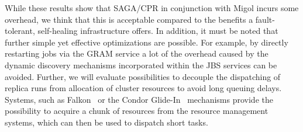 \documentclass[times, 10pt, twocolumn]{article}
\newcommand{\jhanote}[1]{ {\textcolor{red} { ***SJ: #1 }}}
\newcommand{\jhanote}[1]{}
\begin{document}

While these results show that SAGA/CPR in conjunction with Migol
incurs some overhead, we think that this is acceptable compared to the
benefits a fault-tolerant, self-healing infrastructure offers. In
addition, it must be noted that further simple yet effective
optimizations are possible. For example, by directly restarting jobs
via the GRAM service a lot of the overhead caused by the dynamic
discovery mechanisms incorporated within the JBS services can
be avoided. Further, we will evaluate possibilities to decouple
the dispatching of replica runs from allocation of cluster resources 
to avoid long queuing delays. Systems, 
such as Falkon~\cite{1362680} or the Condor Glide-In~\cite{citeulike:291860} mechanisms provide 
the possibility to acquire a chunk of resources from the resource management systems, which can
then be used to dispatch short tasks.


\end{document}
